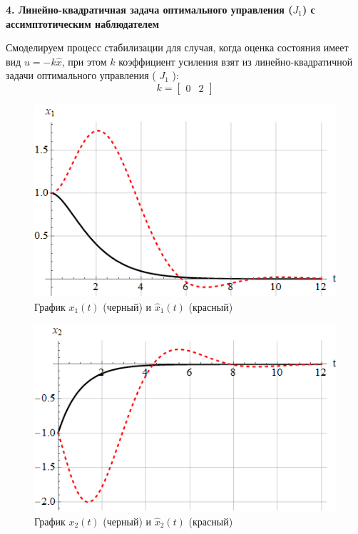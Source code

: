 \newpage

\textbf{4. Линейно-квадратичная задача оптимального управления ($ J_1 $) с ассимптотическим наблюдателем }

Смоделируем процесс стабилизации для случая, когда оценка состояния имеет вид $ u=-k\hat{x} $, при этом $ k $ коэффициент усиления взят из линейно-квадратичной задачи оптимального управления ( $ J_1 $ ):
$$
k = \begin{bmatrix} 0 & 2 \end{bmatrix}
$$

\begin{figure}[h]
    \centering
    \includegraphics[scale=0.7]{chapter_x6/fig5.png}
    \caption{График $ x_1(t) $ (черный) и $ \hat{x}_1(t) $ (красный)}
    \label{}
\end{figure}

\begin{figure}[h]
    \centering
    \includegraphics[scale=0.7]{chapter_x6/fig6.png}
    \caption{График $ x_2(t) $ (черный) и $ \hat{x}_2(t) $ (красный)}
    \label{}
\end{figure}
